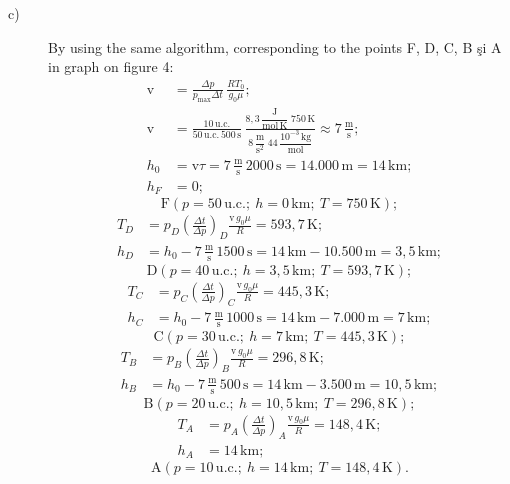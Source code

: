 \begin{description}
\item[c)]
By using the same algorithm, corresponding to the points F, D, C, B \c{s}i A in graph on
figure 4: %
\begin{align*}
\mathrm{v} &= \frac{\Delta p}{p_{\max}\Delta t}\,\frac{RT_0}{g_0\mu};\\
\mathrm{v} &= \frac{10\,\mathrm{u.c.}}{50\,\mathrm{u.c.}\,500\,\mathrm{s}}\,
\frac{8{,}3\,\dfrac{\mathrm{J}}{\mathrm{mol\,K}}\;750\,\mathrm{K}}
     {8\,\dfrac{\mathrm{m}}{\mathrm{s}^2}\;44\,\dfrac{10^{-3}\,\mathrm{kg}}{\mathrm{mol}}}
\approx 7\,\frac{\mathrm{m}}{\mathrm{s}};\\
h_0 &= \mathrm{v}\tau = 7\,\frac{\mathrm{m}}{\mathrm{s}}\,2000\,\mathrm{s}
= 14.000\,\mathrm{m} = 14\,\mathrm{km};\\
h_F &= 0;
\end{align*}
\[
\mathrm{F}(p = 50\,\mathrm{u.c.};\ h = 0\,\mathrm{km};\ T = 750\,\mathrm{K});
\]
\begin{align*}
T_D &= p_D\left(\frac{\Delta t}{\Delta p}\right)_{\!D}\frac{\mathrm{v}\,g_0\mu}{R}
= 593{,}7\,\mathrm{K};\\
h_D &= h_0 - 7\,\frac{\mathrm{m}}{\mathrm{s}}\,1500\,\mathrm{s}
= 14\,\mathrm{km} - 10.500\,\mathrm{m} = 3{,}5\,\mathrm{km};
\end{align*}
\[
\mathrm{D}(p = 40\,\mathrm{u.c.};\ h = 3{,}5\,\mathrm{km};\ T = 593{,}7\,\mathrm{K});
\]
\begin{align*}
T_C &= p_C\left(\frac{\Delta t}{\Delta p}\right)_{\!C}\frac{\mathrm{v}\,g_0\mu}{R}
= 445{,}3\,\mathrm{K};\\
h_C &= h_0 - 7\,\frac{\mathrm{m}}{\mathrm{s}}\,1000\,\mathrm{s}
= 14\,\mathrm{km} - 7.000\,\mathrm{m} = 7\,\mathrm{km};
\end{align*}
\[
\mathrm{C}(p = 30\,\mathrm{u.c.};\ h = 7\,\mathrm{km};\ T = 445{,}3\,\mathrm{K});
\]
\begin{align*}
T_B &= p_B\left(\frac{\Delta t}{\Delta p}\right)_{\!B}\frac{\mathrm{v}\,g_0\mu}{R}
= 296{,}8\,\mathrm{K};\\
h_B &= h_0 - 7\,\frac{\mathrm{m}}{\mathrm{s}}\,500\,\mathrm{s}
= 14\,\mathrm{km} - 3.500\,\mathrm{m} = 10{,}5\,\mathrm{km};
\end{align*}
\[
\mathrm{B}(p = 20\,\mathrm{u.c.};\ h = 10{,}5\,\mathrm{km};\ T = 296{,}8\,\mathrm{K});
\]
\begin{align*}
T_A &= p_A\left(\frac{\Delta t}{\Delta p}\right)_{\!A}\frac{\mathrm{v}\,g_0\mu}{R}
= 148{,}4\,\mathrm{K};\\
h_A &= 14\,\mathrm{km};
\end{align*}
\[
\mathrm{A}(p = 10\,\mathrm{u.c.};\ h = 14\,\mathrm{km};\ T = 148{,}4\,\mathrm{K}).
\]


\end{description}
